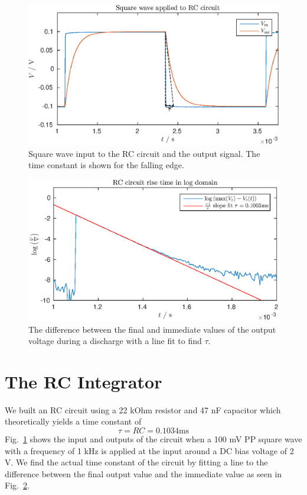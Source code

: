 

\newcommand{\reffig}[1]{Fig.~\ref{#1}}



\newpage
\begin{figure}[!htb]
    \center
    \includegraphics{ex1-step.eps}
    \caption{Square wave input to the RC circuit and the output signal. The time constant is shown for the falling edge.}
    \label{fig:ex1-1}
\end{figure}
\begin{figure}[!htb]
    \center
    \includegraphics{ex1-log.eps}
    \caption{The difference between the final and immediate values of the output voltage during a discharge with a line fit to find \(\tau\).}
    \label{fig:ex1-2}
\end{figure}
\section{The RC Integrator}
We built an RC circuit using a 22 kOhm resistor and 47 nF capacitor which theoretically yields a time constant of
\begin{equation*}
    \tau = RC = 0.1034 \mathrm{ms}
\end{equation*}
Fig.~\ref{fig:ex1-1} shows the input and outputs of the circuit when a 100 mV PP square wave with a frequency of 1 kHz is applied at the input around
a DC bias voltage of 2 V. We find the actual time constant of the circuit by fitting a line to the difference between the 
final output value and the immediate value as seen in Fig.~\ref{fig:ex1-2}. 

